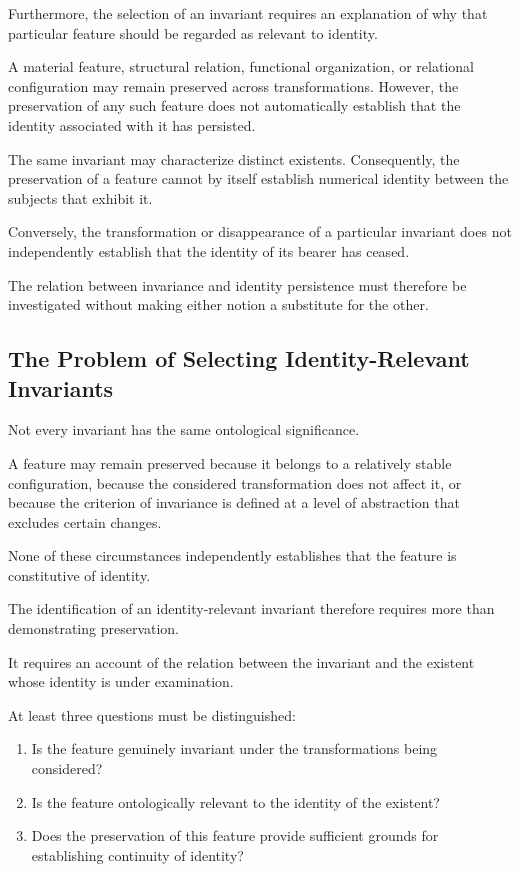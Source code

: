 Furthermore, the selection of an invariant requires
an explanation of why that particular feature should
be regarded as relevant to identity.

A material feature, structural relation, functional
organization, or relational configuration may remain
preserved across transformations. However, the preservation
of any such feature does not automatically establish
that the identity associated with it has persisted.

The same invariant may characterize distinct existents.
Consequently, the preservation of a feature cannot
by itself establish numerical identity between the
subjects that exhibit it.

Conversely, the transformation or disappearance of
a particular invariant does not independently establish
that the identity of its bearer has ceased.

The relation between invariance and identity persistence
must therefore be investigated without making either
notion a substitute for the other.

\subsection{The Problem of Selecting Identity-Relevant Invariants}

Not every invariant has the same ontological significance.

A feature may remain preserved because it belongs
to a relatively stable configuration, because the
considered transformation does not affect it, or
because the criterion of invariance is defined at
a level of abstraction that excludes certain changes.

None of these circumstances independently establishes
that the feature is constitutive of identity.

The identification of an identity-relevant invariant
therefore requires more than demonstrating preservation.

It requires an account of the relation between the
invariant and the existent whose identity is under
examination.

At least three questions must be distinguished:

\begin{enumerate}
    \item Is the feature genuinely invariant under
    the transformations being considered?
    \item Is the feature ontologically relevant to
    the identity of the existent?
    \item Does the preservation of this feature provide
    sufficient grounds for establishing continuity
    of identity?
\end{enumerate}


